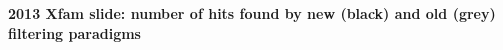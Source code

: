 \documentclass[landscape]{slides}
\begin{document}
\begin{slide}


\vfill
\end{slide}
\begin{slide}
\small
\begin{center}
\textbf{2013 Xfam slide: number of hits found by new (black) and old (grey) filtering paradigms}
\end{center}


\vfill
\end{slide}
\end{document}
